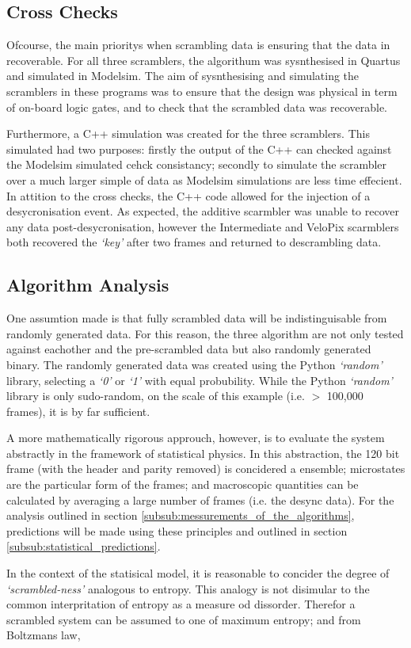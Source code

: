 	\subsection{Cross Checks} %
	\label{sub:cross_checks}
	
		Ofcourse, the main prioritys when scrambling data is ensuring that the data in recoverable.
		For all three scramblers, the algorithum was sysnthesised in Quartus\cite{ref:quartus} and simulated in Modelsim\cite{ref:modelsim}.
		The aim of sysnthesising and simulating the scramblers in these programs was to ensure that the design was physical in term of on-board logic gates, and to check that the scrambled  data was recoverable.

		Furthermore, a C++ simulation was created for the three scramblers.
		This simulated had two purposes:
		firstly the output of the C++ can checked against the Modelsim simulated cehck consistancy;
		secondly to simulate the scrambler over a much larger simple of data as Modelsim simulations are less time effecient.
		In attition to the cross checks, the C++ code allowed for the injection of a desycronisation event.
		As expected, the additive scarmbler was unable to recover any data post-desycronisation, however the Intermediate and VeloPix scarmblers both recovered the \textit{`key'} after two frames and returned to descrambling data.


	\subsection{Algorithm Analysis}
	\label{sub:algorithm_analysis}

		One assumtion made is that fully scrambled data will be indistinguisable from randomly generated data. 
		For this reason, the three algorithm are not only tested against eachother and the pre-scrambled data but also randomly generated binary.
		The randomly generated data was created using the Python \textit{`random'} library, selecting a \textit{`0'} or \textit{`1'} with equal probubility.
		While the Python \textit{`random'} library is only sudo-random, on the scale of this example (i.e. $>$ 100,000 frames), it is by far sufficient.
		\par
		A more mathematically rigorous approuch, however, is to evaluate the system abstractly in the framework of statistical physics.
		In this abstraction, the 120 bit frame (with the header and parity removed) is concidered a ensemble; 
		microstates are the particular form of the frames;
		and macroscopic quantities can be calculated by averaging a large number of frames (i.e. the desync data).
		For the analysis outlined in section \ref{subsub:messurements_of_the_algorithms}, predictions will be made using these principles and outlined in section \ref{subsub:statistical_predictions}.
		\par
		In the context of the statisical model, it is reasonable to concider the degree of \textit{`scrambled-ness'} analogous to entropy.
		This analogy is not disimular to the common interpritation of entropy as a measure od dissorder.
		Therefor a scrambled system can be assumed to one of maximum entropy; and from Boltzmans law,

